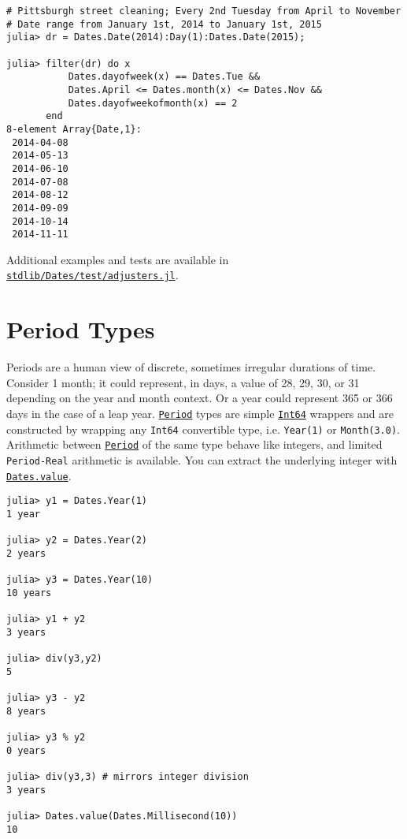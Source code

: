 \begin{verbatim}
# Pittsburgh street cleaning; Every 2nd Tuesday from April to November
# Date range from January 1st, 2014 to January 1st, 2015
julia> dr = Dates.Date(2014):Day(1):Dates.Date(2015);

julia> filter(dr) do x
           Dates.dayofweek(x) == Dates.Tue &&
           Dates.April <= Dates.month(x) <= Dates.Nov &&
           Dates.dayofweekofmonth(x) == 2
       end
8-element Array{Date,1}:
 2014-04-08
 2014-05-13
 2014-06-10
 2014-07-08
 2014-08-12
 2014-09-09
 2014-10-14
 2014-11-11
\end{verbatim}



Additional examples and tests are available in \href{https://github.com/JuliaLang/julia/blob/master/stdlib/Dates/test/adjusters.jl}{\texttt{stdlib/Dates/test/adjusters.jl}}.



\hypertarget{6665623146623573170}{}


\section{Period Types}



Periods are a human view of discrete, sometimes irregular durations of time. Consider 1 month; it could represent, in days, a value of 28, 29, 30, or 31 depending on the year and month context. Or a year could represent 365 or 366 days in the case of a leap year. \hyperlink{17624028548543163266}{\texttt{Period}} types are simple \hyperlink{7720564657383125058}{\texttt{Int64}} wrappers and are constructed by wrapping any \texttt{Int64} convertible type, i.e. \texttt{Year(1)} or \texttt{Month(3.0)}. Arithmetic between \hyperlink{17624028548543163266}{\texttt{Period}} of the same type behave like integers, and limited \texttt{Period-Real} arithmetic is available.  You can extract the underlying integer with \hyperlink{6471383377711200525}{\texttt{Dates.value}}.




\begin{verbatim}
julia> y1 = Dates.Year(1)
1 year

julia> y2 = Dates.Year(2)
2 years

julia> y3 = Dates.Year(10)
10 years

julia> y1 + y2
3 years

julia> div(y3,y2)
5

julia> y3 - y2
8 years

julia> y3 % y2
0 years

julia> div(y3,3) # mirrors integer division
3 years

julia> Dates.value(Dates.Millisecond(10))
10
\end{verbatim}



